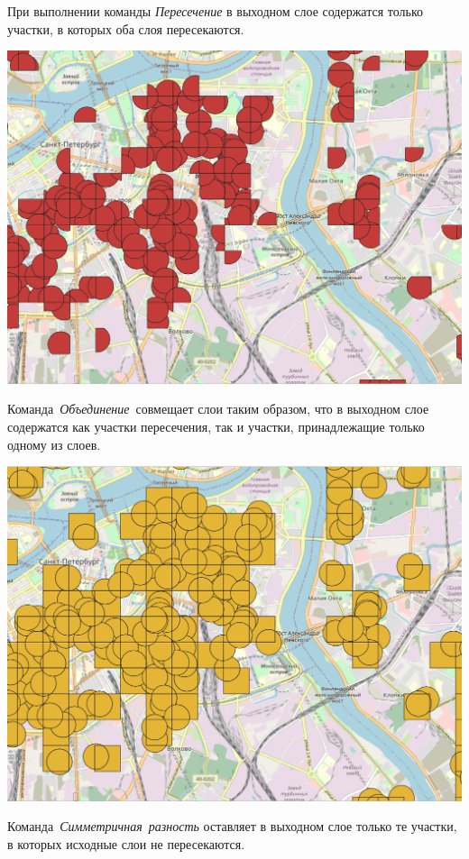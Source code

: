 \documentclass[
]{book}
\begin{document}
При выполнении команды \emph{Пересечение} в выходном слое содержатся только участки, в которых оба слоя пересекаются.

\includegraphics{figures/54.PNG}

Команда~\emph{Объединение}~совмещает слои таким образом, что в выходном слое содержатся как участки пересечения, так и участки, принадлежащие только одному из слоев.

\includegraphics{figures/55.PNG}

Команда~\emph{Симметричная~разность} оставляет в выходном слое только те участки, в которых исходные слои не пересекаются.
\end{document}
